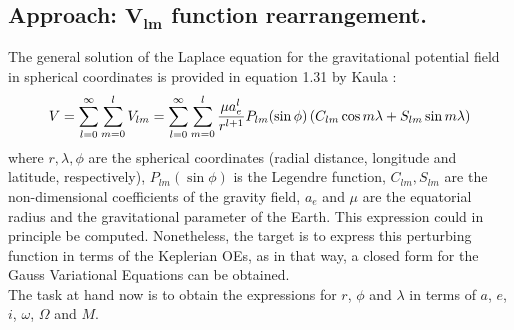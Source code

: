 	\subsection{Approach: $\bm{V_{lm}}$ function rearrangement.}
	\indent The general solution of the Laplace equation for the gravitational potential field in spherical coordinates is provided in equation 1.31 by Kaula \cite{Kaula}:
	\begin{align}
	V = \displaystyle\sum_{l = 0}^{\infty} \displaystyle\sum_{m = 0}^l V_{lm} = \displaystyle\sum_{l = 0}^{\infty} \displaystyle\sum_{m = 0}^l\dfrac{\mu a_e^l}{r^{l+1}} P_{lm}(\sin\phi) \left( C_{lm} \cos m\lambda + S_{lm}\sin m\lambda\right)
	\label{eq:V_lm_1}
	\end{align}
	\noindent where $r, \lambda, \phi$ are the spherical coordinates (radial distance, longitude and latitude, respectively), $P_{lm}(\sin\phi)$ is the Legendre function, $C_{lm}, S_{lm}$ are the non-dimensional coefficients of the gravity field, $a_e$ and $\mu$ are the equatorial radius and the gravitational parameter of the Earth. This expression could in principle be computed. Nonetheless, the target is to express this perturbing function in terms of the Keplerian OEs, as in that way, a closed form for the Gauss Variational Equations can be obtained.\\
	\indent The task at hand now is to obtain the expressions for $r$, $\phi$ and $\lambda$ in terms of $a$, $e$, $i$, $\omega$, $\Omega$ and $M$. 

